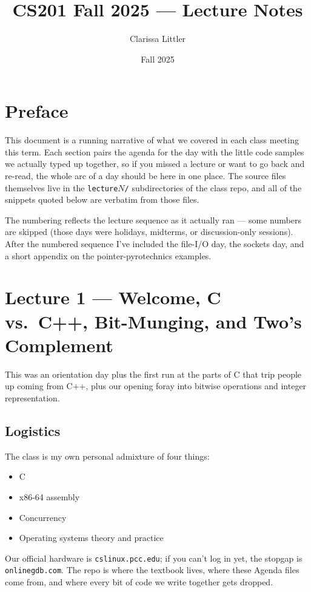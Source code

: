 \documentclass[11pt]{article}
\title{CS201 Fall 2025 --- Lecture Notes}
\author{Clarissa Littler}
\date{Fall 2025}
\begin{document}
\maketitle

\section*{Preface}

This document is a running narrative of what we covered in each class
meeting this term. Each section pairs the agenda for the day with the
little code samples we actually typed up together, so if you missed a
lecture or want to go back and re-read, the whole arc of a day should be
here in one place. The source files themselves live in the
\texttt{lecture$N$/} subdirectories of the class repo, and all of the
snippets quoted below are verbatim from those files.

The numbering reflects the lecture sequence as it actually ran ---
some numbers are skipped (those days were holidays, midterms, or
discussion-only sessions). After the numbered sequence I've included
the file-I/O day, the sockets day, and a short appendix on the
pointer-pyrotechnics examples.

\tableofcontents

\section{Lecture 1 --- Welcome, C vs.\ C++, Bit-Munging, and Two's Complement}

This was an orientation day plus the first run at the parts of C that
trip people up coming from C++, plus our opening foray into bitwise
operations and integer representation.

\subsection*{Logistics}

The class is my own personal admixture of four things:
\begin{itemize}
  \item C
  \item x86-64 assembly
  \item Concurrency
  \item Operating systems theory and practice
\end{itemize}
Our official hardware is \texttt{cslinux.pcc.edu}; if you can't log
in yet, the stopgap is \texttt{onlinegdb.com}. The repo is where the
textbook lives, where these Agenda files come from, and where every
bit of code we write together gets dropped.
\end{document}
